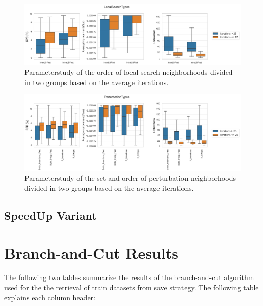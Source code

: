 \begin{figure}[!ht]
    \centering
    \includegraphics[width=\textwidth]{pictures/parameter_study/LocalSearchTypes_base_parameter_study.png}
    \caption{Parameterstudy of the order of local search neighborhoods divided in two groups based on the average iterations.}
    \label{fig:parameterstudy_NoClassifier_localSearch}
\end{figure}

\begin{figure}[!ht]
    \centering
    \includegraphics[width=\textwidth]{pictures/parameter_study/PerturbationTypes_base_parameter_study.png}
    \caption{Parameterstudy of the set and order of perturbation neighborhoods divided in two groups based on the average iterations.}
    \label{fig:parameterstudy_NoClassifier_perturbation}
\end{figure}

\subsection{SpeedUp Variant}
\label{app:subsec:parameterstudy_SpeedUp}

\clearpage
\section{Branch-and-Cut Results}

The following two tables summarize the results of the branch-and-cut algorithm used for the the retrieval of train datasets
from save strategy. The following table explains each column header:

